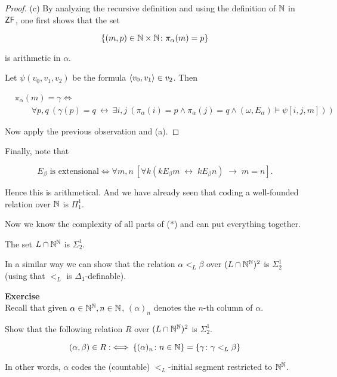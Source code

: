 \begin{proof}
(c) By analyzing the recursive definition and using the definition of $\mathbb{N}$ in $\mathsf{ZF}$, one first shows that the set

\begin{equation}
\{ (m,p) \in \mathbb{N}\times \mathbb{N}  \colon \pi_\alpha(m) = p \}
\end{equation}

is arithmetic in $\alpha$.

Let $\psi(v_0, v_1, v_2)$ be the formula $\langle v_0, v_1 \rangle \in v_2$. Then

\begin{align*}
    & \pi_\alpha(m) = \gamma \iff \\ 
    & \qquad \forall p, q \: \left (\gamma(p) = q \: \leftrightarrow \: \exists i,j \: (\pi_\alpha(i) = p \wedge \pi_\alpha(j)=q \wedge (\omega,E_\alpha) \models \psi[i,j,m]) \right )
\end{align*}

Now apply the previous observation and (a).

\end{proof}Finally, note that

\begin{equation}
\text{$E_\beta$ is extensional} \iff \forall m,n \: [\forall k (k E_\beta m \; \leftrightarrow \; k E_\beta n) \; \to \; m=n ].
\end{equation}

Hence this is arithmetical. And we have already seen that coding a well-founded relation over $\mathbb{N}$ is $\Pi^1_1$.

Now we know the complexity of all parts of ($*$) and can put everything together.

\begin{theorem}\label{thm-l-reals}The set $L \cap \mathbb{N}^{\mathbb{N}}$ is $\Sigma^1_2$.

\end{theorem}In a similar way we can show that the relation $\alpha <_L \beta$ over $(L\cap\mathbb{N}^{\mathbb{N}})^2$ is $\Sigma^1_2$ (using that $<_L$ is $\Delta_1$-definable).

\begin{framed}
\textbf{Exercise}\\
Recall that given $\alpha \in \mathbb{N}^{\mathbb{N}}, n \in \mathbb{N}$, $(\alpha)_n$ denotes the $n$-th column of $\alpha$.

Show that the following relation $R$ over $(L\cap\mathbb{N}^{\mathbb{N}})^2$ is $\Sigma^1_2$.

\begin{equation}
(\alpha, \beta) \in R :\iff \{(\alpha)_n\colon n \in \mathbb{N} \} = \{\gamma \colon \gamma <_L \beta \}
\end{equation}

In other words, $\alpha$ codes the (countable) $<_L$-initial segment restricted to $\mathbb{N}^{\mathbb{N}}$.
\end{framed}


